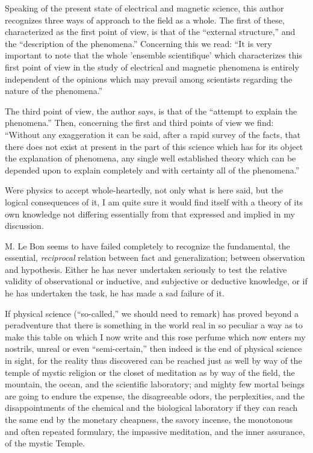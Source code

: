 \documentclass[a4paper, 11pt, oneside, polutonikogreek, english, landscape]{article}
\begin{document}
Speaking of the present state of electrical and magnetic science, this author recognizes three ways of approach to the field as a whole. The first of these, characterized as the first point of view, is that of the ``external structure,'' and the ``description of the phenomena.'' Concerning this we read: ``It is very important to note that the whole 'ensemble scientifique' which characterizes this first point of view in the study of electrical and magnetic phenomena is entirely independent of the opinions which may prevail among scientists regarding the nature of the phenomena.''

The third point of view, the author says, is that of the ``attempt to explain the phenomena.'' Then, concerning the first and third points of view we find: ``Without any exaggeration it can be said, after a rapid survey of the facts, that there does not exist at present in the part of this science which has for its object the explanation of phenomena, any single well established theory which can be depended upon to explain completely and with certainty all of the phenomena.''

Were physics to accept whole-heartedly, not only what is here said, but the logical consequences of it, I am quite sure it would find itself with a theory of its own knowledge not differing essentially from that expressed and implied in my discussion.

M. Le Bon seems to have failed completely to recognize the fundamental, the essential, \emph{reciprocal} relation between fact and generalization; between observation and hypothesis. Either he has never undertaken seriously to test the relative validity of observational or inductive, and subjective or deductive knowledge, or if he has undertaken the task, he has made a sad failure of it.

If physical science (``so-called,'' we should need to remark) has proved beyond a peradventure that there is something in the world real in so peculiar a way as to make this table on which I now write and this rose perfume which now enters my nostrils, unreal or even ``semi-certain,'' then indeed is the end of physical science in sight, for the reality thus discovered can be reached just as well by way of the temple of mystic religion or the closet of meditation as by way of the field, the mountain, the ocean, and the scientific laboratory; and mighty few mortal beings are going to endure the expense, the disagreeable odors, the perplexities, and the disappointments of the chemical and the biological laboratory if they can reach the same end by the monetary cheapness, the savory incense, the monotonous and often repeated formulary, the impassive meditation, and the inner assurance, of the mystic Temple.
\end{document}
